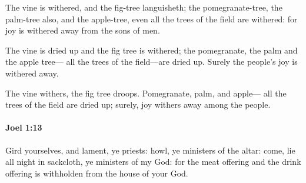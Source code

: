 			\begin{versebox}
					\item[BHS] 
					\item[LXX] 
					\item[ASV] The vine is withered, and the fig-tree languisheth; the pomegranate-tree, the palm-tree also, and the apple-tree, even all the trees of the field are withered: for joy is withered away from the sons of men.
					\item[NIV] The vine is dried up and the fig tree is withered; the pomegranate, the palm and the apple tree— all the trees of the field—are dried up. Surely the people’s joy is withered away.
					\item[NRSV] The vine withers, the fig tree droops. Pomegranate, palm, and apple— all the trees of the field are dried up; surely, joy withers away among the people.
			\end{versebox}

		\paragraph{Joel 1:13} %
			\label{JOEL-1-13}

			Gird yourselves, and lament, ye priests: howl, ye ministers of the altar: come, lie all night in sackcloth, ye ministers of my God: for the meat offering and the drink offering is withholden from the house of your God.


